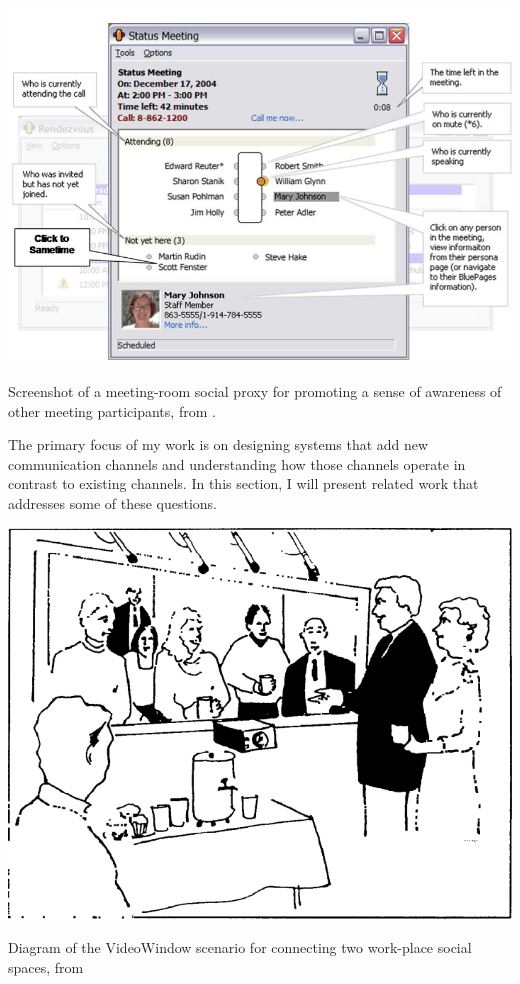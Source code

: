 \begin{marginfigure}
	\includegraphics{figures/kellog_social_proxies.png}
	\caption{Screenshot of a meeting-room social proxy for promoting a sense of awareness of other meeting participants, from \citep{kellogg_leveraging_2006}.}
	\label{fig:social-proxies}
\end{marginfigure}

The primary focus of my work is on designing systems that add new communication channels and understanding how those channels operate in contrast to existing channels. In this section, I will present related work that addresses some of these questions.

\begin{marginfigure}
	\includegraphics{figures/videowindow.png}
	\caption{Diagram of the VideoWindow scenario for connecting two work-place social spaces, from \citep{Fish:1990fn}}
	\label{fig:videowindow}
\end{marginfigure}

